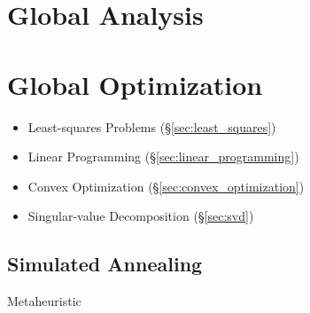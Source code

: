 \section{Global Analysis}\label{sec:global_analysis}

\section{Global Optimization}\label{sec:global_optimization}

\begin{itemize}
  \item Least-squares Problems (\S\ref{sec:least_squares})
  \item Linear Programming (\S\ref{sec:linear_programming})
  \item Convex Optimization (\S\ref{sec:convex_optimization})
  \item Singular-value Decomposition (\S\ref{sec:svd})
\end{itemize}



\subsection{Simulated Annealing}\label{sec:simualted_annealing}

Metaheuristic
